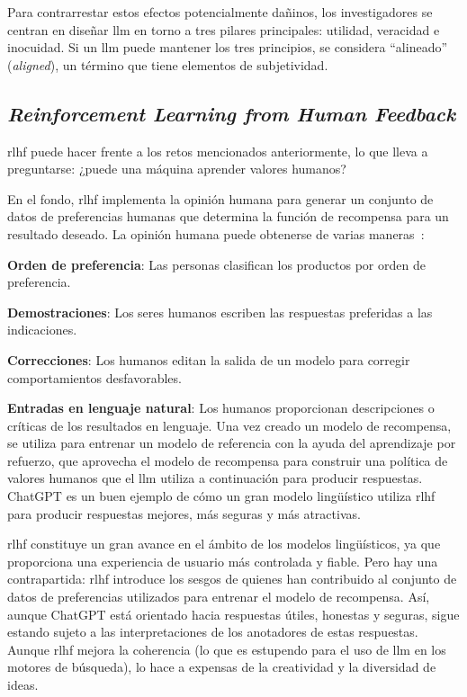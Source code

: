 Para contrarrestar estos efectos potencialmente dañinos, los investigadores se centran en diseñar \acrshort{llm} en torno a tres pilares principales: utilidad, veracidad e inocuidad. Si un \acrshort{llm} puede mantener los tres principios, se considera ``alineado'' (\textit{aligned}), un término que tiene elementos de subjetividad.

\subsection{\textit{Reinforcement Learning from Human Feedback}}

\acrfull{rlhf} puede hacer frente a los retos mencionados anteriormente, lo que  lleva a preguntarse: ¿puede una máquina aprender valores humanos?

En el fondo, \acrshort{rlhf} implementa la opinión humana para generar un conjunto de datos de preferencias humanas que determina la función de recompensa para un resultado deseado. La opinión humana puede obtenerse de varias maneras~\cite{Tolaka}:

\begin{description}    

\item \textbf{Orden de preferencia}: Las personas clasifican los productos por orden de preferencia.

\item \textbf{Demostraciones}: Los seres humanos escriben las respuestas preferidas a las indicaciones.

\item \textbf{Correcciones}: Los humanos editan la salida de un modelo para corregir comportamientos desfavorables.

\item \textbf{Entradas en lenguaje natural}: Los humanos proporcionan descripciones o críticas de los resultados en lenguaje. Una vez creado un modelo de recompensa, se utiliza para entrenar un modelo de referencia con la ayuda del aprendizaje por refuerzo, que aprovecha el modelo de recompensa para construir una política de valores humanos que el \acrlong{llm} utiliza a continuación para producir respuestas. ChatGPT es un buen ejemplo de cómo un gran modelo lingüístico utiliza \acrshort{rlhf} para producir respuestas mejores, más seguras y más atractivas.

\end{description}

\acrshort{rlhf} constituye un gran avance en el ámbito de los modelos lingüísticos, ya que proporciona una experiencia de usuario más controlada y fiable. Pero hay una contrapartida: \acrshort{rlhf} introduce los sesgos de quienes han contribuido al conjunto de datos de preferencias utilizados para entrenar el modelo de recompensa. Así, aunque ChatGPT está orientado hacia respuestas útiles, honestas y seguras, sigue estando sujeto a las interpretaciones de los anotadores de estas respuestas. Aunque \acrshort{rlhf} mejora la coherencia (lo que es estupendo para el uso de \acrshort{llm} en los motores de búsqueda), lo hace a expensas de la creatividad y la diversidad de ideas.

